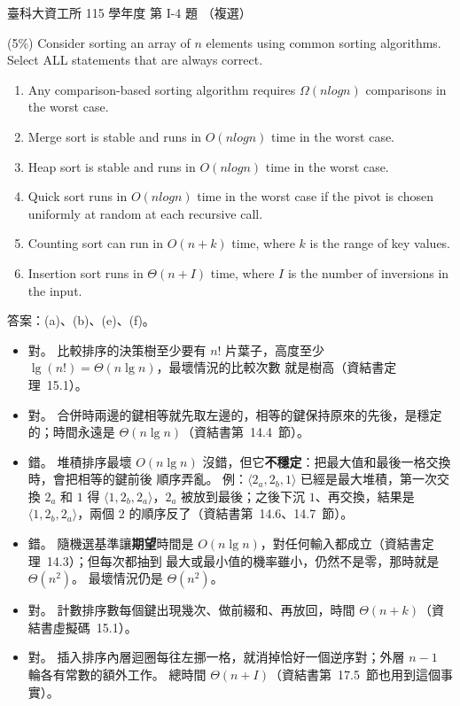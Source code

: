 \begin{pastexam}[label={px:ntust-115-ice-04}]{臺科大資工所 115 學年度 第 I-4 題}
（複選）

(5\%) Consider sorting an array of $n$ elements using common sorting algorithms. Select ALL statements that
are always correct.
\begin{enumerate}[label=(\alph*)]
\item Any comparison-based sorting algorithm requires $\Omega(nlogn)$ comparisons in the worst case.
\item Merge sort is stable and runs in $O(nlogn)$ time in the worst case.
\item Heap sort is stable and runs in $O(nlogn)$ time in the worst case.
\item Quick sort runs in $O(nlogn)$ time in the worst case if the pivot is chosen uniformly at random at
each recursive call.
\item Counting sort can run in $O(n+k)$ time, where $k$ is the range of key values.
\item Insertion sort runs in $\Theta(n+I)$ time, where $I$ is the number of inversions in the input.
\end{enumerate}
\end{pastexam}

\begin{pastsoln}
答案：(a)、(b)、(e)、(f)。

\begin{itemize}
\item[(a)] 對。 比較排序的決策樹至少要有 $n!$ 片葉子，高度至少 $\lg(n!) = \Theta(n \lg n)$，最壞情況的比較次數
就是樹高（資結書定理~15.1）。
\item[(b)] 對。 合併時兩邊的鍵相等就先取左邊的，相等的鍵保持原來的先後，是穩定的；時間永遠是
$\Theta(n \lg n)$（資結書第~14.4~節）。
\item[(c)] 錯。 堆積排序最壞 $O(n \lg n)$ 沒錯，但它\textbf{不穩定}：把最大值和最後一格交換時，會把相等的鍵前後
順序弄亂。 例：$\langle 2_a, 2_b, 1\rangle$ 已經是最大堆積，第一次交換 $2_a$ 和 $1$ 得
$\langle 1, 2_b, 2_a\rangle$，$2_a$ 被放到最後；之後下沉 $1$、再交換，結果是 $\langle 1, 2_b, 2_a\rangle$，兩個
$2$ 的順序反了（資結書第~14.6、14.7~節）。
\item[(d)] 錯。 隨機選基準讓\textbf{期望}時間是 $O(n \lg n)$，對任何輸入都成立（資結書定理~14.3）；但每次都抽到
最大或最小值的機率雖小，仍然不是零，那時就是 $\Theta(n^2)$。 最壞情況仍是 $\Theta(n^2)$。
\item[(e)] 對。 計數排序數每個鍵出現幾次、做前綴和、再放回，時間 $\Theta(n + k)$（資結書虛擬碼~15.1）。
\item[(f)] 對。 插入排序內層迴圈每往左挪一格，就消掉恰好一個逆序對；外層 $n - 1$ 輪各有常數的額外工作。 總時間
$\Theta(n + I)$（資結書第~17.5~節也用到這個事實）。
\end{itemize}
\end{pastsoln}
